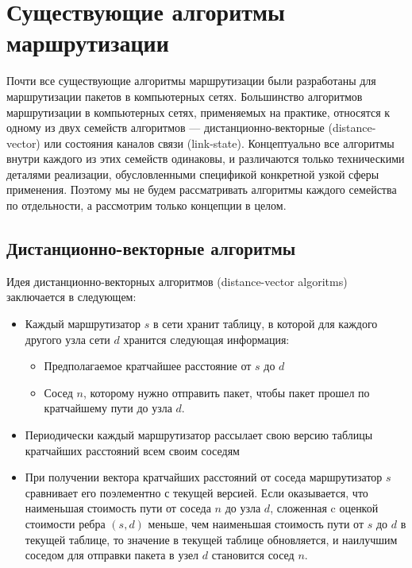 \documentclass[]{itmo-student-thesis}
\begin{document}
\section{Существующие алгоритмы маршрутизации}

Почти все существующие алгоритмы маршрутизации были разработаны для
маршрутизации пакетов в компьютерных сетях. Большинство алгоритмов маршрутизации
в компьютерных сетях, применяемых на практике, относятся к одному из двух
семейств алгоритмов --- дистанционно-векторные (distance-vector)\cite{arpanet-orig} или
состояния каналов связи (link-state)\cite{link-state-arpanet}.
Концептуально все алгоритмы внутри каждого из этих семейств одинаковы, и различаются только
техническими деталями реализации, обусловленными спецификой конкретной узкой
сферы применения. Поэтому мы не будем рассматривать алгоритмы каждого семейства
по отдельности, а рассмотрим только концепции в целом.

\subsection{Дистанционно-векторные алгоритмы}

Идея дистанционно-векторных алгоритмов (distance-vector algoritms) заключается в
следующем:

\begin{itemize}
\item Каждый маршрутизатор $s$ в сети хранит таблицу, в которой для каждого другого узла
  сети $d$ хранится следующая информация:
  \begin{itemize}
  \item Предполагаемое кратчайшее расстояние от $s$ до $d$
  \item Сосед $n$, которому нужно отправить пакет, чтобы пакет прошел по
    кратчайшему пути до узла $d$.
  \end{itemize}
\item Периодически каждый маршрутизатор рассылает свою версию таблицы кратчайших
  расстояний всем своим соседям
\item При получении вектора кратчайших расстояний от соседа маршрутизатор $s$
  сравнивает его поэлементно с текущей версией. Если оказывается, что наименьшая
  стоимость пути от соседа $n$ до узла $d$, сложенная c оценкой стоимости ребра
  $(s, d)$ меньше, чем наименьшая стоимость пути от $s$ до $d$ в текущей
  таблице, то значение в текущей таблице обновляется, и наилучшим соседом для
  отправки пакета в узел $d$ становится сосед $n$.
\end{itemize}
\end{document}

